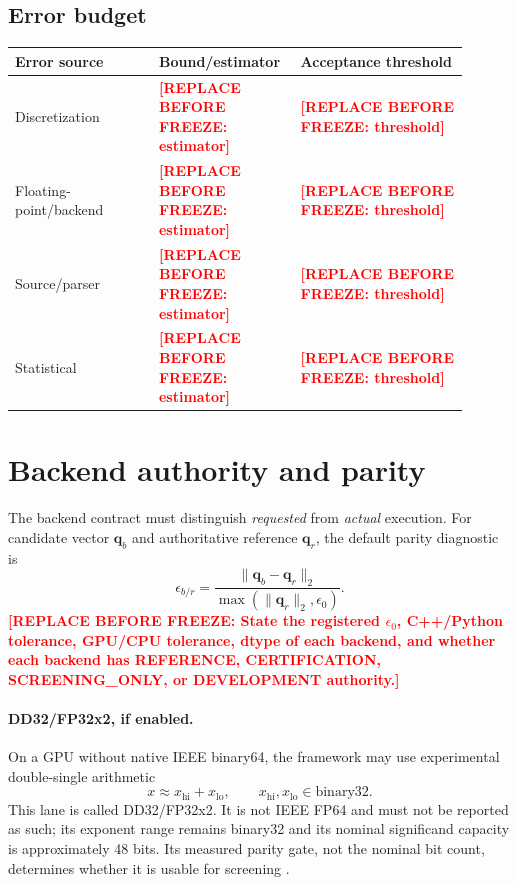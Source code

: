 \documentclass[11pt,a4paper]{article}
\newcommand{\SSTTODO}[1]{\ifmmode\text{\color{red}\bfseries TODO}\else\textcolor{red}{\textbf{[REPLACE BEFORE FREEZE: #1]}}\fi}
\begin{document}
\subsection{Error budget}
\begin{longtable}{p{0.30\linewidth}p{0.25\linewidth}p{0.35\linewidth}}
\toprule
Error source & Bound/estimator & Acceptance threshold \\
\midrule
Discretization & \SSTTODO{estimator} & \SSTTODO{threshold} \\
Floating-point/backend & \SSTTODO{estimator} & \SSTTODO{threshold} \\
Source/parser & \SSTTODO{estimator} & \SSTTODO{threshold} \\
Statistical & \SSTTODO{estimator} & \SSTTODO{threshold} \\
\bottomrule
\end{longtable}

\section{Backend authority and parity}
The backend contract must distinguish \emph{requested} from \emph{actual} execution. For candidate vector $\mathbf q_b$ and authoritative reference $\mathbf q_r$, the default parity diagnostic is
\begin{equation}
\epsilon_{b/r}=\frac{\|\mathbf q_b-\mathbf q_r\|_2}{\max(\|\mathbf q_r\|_2,\epsilon_0)}.
\end{equation}
\SSTTODO{State the registered $\epsilon_0$, C++/Python tolerance, GPU/CPU tolerance, dtype of each backend, and whether each backend has REFERENCE, CERTIFICATION, SCREENING\_ONLY, or DEVELOPMENT authority.}

\paragraph{DD32/FP32x2, if enabled.}
On a GPU without native IEEE binary64, the framework may use experimental double-single arithmetic
\begin{equation}
x \approx x_{\mathrm{hi}}+x_{\mathrm{lo}},\qquad x_{\mathrm{hi}},x_{\mathrm{lo}}\in\mathrm{binary32}.
\end{equation}
This lane is called DD32/FP32x2. It is not IEEE FP64 and must not be reported as such; its exponent range remains binary32 and its nominal significand capacity is approximately 48 bits. Its measured parity gate, not the nominal bit count, determines whether it is usable for screening \cite{Dekker1971,DaGracaDefour2006}.
\end{document}

